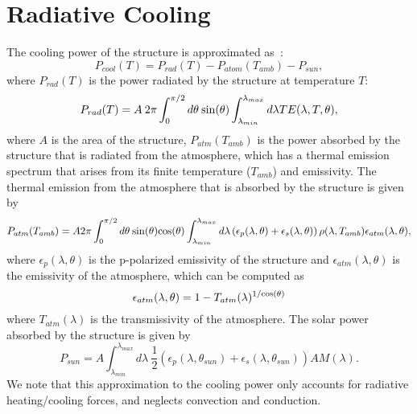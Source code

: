 \documentclass[journal=jpclcd,manuscript=suppinfo]{achemso}
\begin{document}
\section{Radiative Cooling}
The cooling power of the structure is approximated as~\cite{RAZ_Nature_2014}:
\begin{equation}
P_{cool}(T) = P_{rad}(T) - P_{atom}(T_{amb}) - P_{sun},
\end{equation} 
where $P_{rad}(T)$ is the power radiated by the structure at temperature $T$:
\begin{equation}
P_{rad}(T) = A \: 2\pi \int_0^{\pi/2} d\theta \: {\rm sin}(\theta) \int_{\lambda_{min}}^{\lambda_{max}} d\lambda TE(\lambda, T, \theta),
\end{equation}
where $A$ is the area of the structure, $P_{atm}(T_{amb})$ is the power absorbed by the structure that is radiated from the
atmosphere, which has a thermal emission spectrum that arises from its finite temperature ($T_{amb}$) and emissivity.  The
thermal emission from the atmosphere that is absorbed by the structure is given by
\begin{equation}
P_{atm}(T_{amb}) = A 2\pi \int_0^{\pi/2} d\theta \: {\rm sin}(\theta) {\rm cos}(\theta)\int_{\lambda_{min}}^{\lambda_{max}} 
d\lambda \left(\epsilon_p(\lambda, \theta) + \epsilon_s(\lambda, \theta)  \right) \rho(\lambda, T_{amb}) 
\epsilon_{atm}(\lambda, \theta),
\end{equation}
where $\epsilon_p(\lambda, \theta)$ is the p-polarized emissivity of the structure and $\epsilon_{atm}(\lambda, \theta)$ is the
emissivity of the atmosphere, which can be computed as 
\begin{equation}
\epsilon_{atm}(\lambda, \theta) = 1-T_{atm}(\lambda)^{1/{\rm cos}(\theta)}
\end{equation}
where $T_{atm}(\lambda)$ is the transmissivity of the atmosphere.
The solar power absorbed by the structure is given by 
\begin{equation}
P_{sun} = A \int_{\lambda_{min}}^{\lambda_{max}} d\lambda \: \frac{1}{2} \left( \epsilon_p(\lambda, \theta_{sun}) + \epsilon_s(\lambda, \theta_{sun})\right) AM(\lambda).
\end{equation}
We note that this approximation to the cooling power only accounts for radiative heating/cooling forces, and neglects
convection and conduction.
\end{document}
